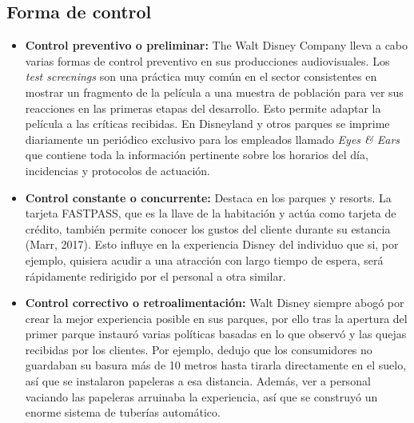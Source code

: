 \subsection{Forma de control}

\begin{itemize}

\item
\textbf{Control preventivo o preliminar:} The Walt Disney Company lleva a cabo varias formas de control preventivo en sus producciones audiovisuales. Los \textit{test screenings} son una práctica muy común en el sector consistentes en mostrar un fragmento de la película a una muestra de población para ver sus reacciones en las primeras etapas del desarrollo. Esto permite adaptar la película a las críticas recibidas. En Disneyland y otros parques se imprime diariamente un periódico exclusivo para los empleados llamado \textit{Eyes \& Ears} que contiene toda la información pertinente sobre los horarios del día, incidencias y protocolos de actuación.

\item
\textbf{Control constante o concurrente:} Destaca en los parques y resorts. La tarjeta FASTPASS, que es la llave de la habitación y actúa como tarjeta de crédito, también permite conocer los gustos del cliente durante su estancia (Marr, 2017). Esto influye en la experiencia Disney del individuo que si, por ejemplo, quisiera acudir a una atracción con largo tiempo de espera, será rápidamente redirigido por el personal a otra similar.

\item
\textbf{Control correctivo o retroalimentación:} Walt Disney siempre abogó por crear la mejor experiencia posible en sus parques, por ello tras la apertura del primer parque instauró varias políticas basadas en lo que observó y las quejas recibidas por los clientes. Por ejemplo, dedujo que los consumidores no guardaban su basura más de 10 metros hasta tirarla directamente en el suelo, así que se instalaron papeleras a esa distancia. Además, ver a personal vaciando las papeleras arruinaba la experiencia, así que se construyó un enorme sistema de tuberías automático. 

\end{itemize}